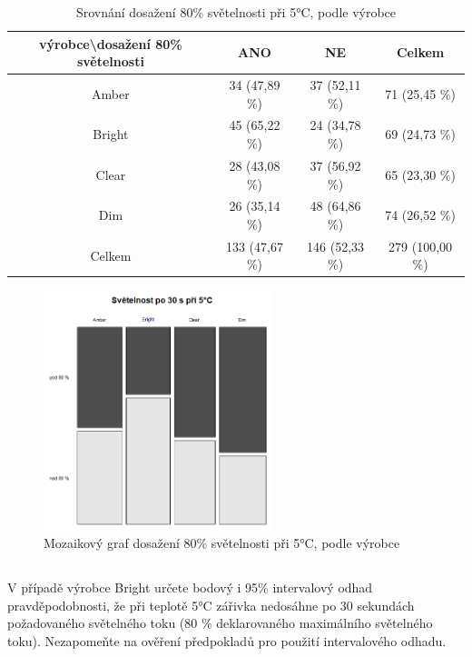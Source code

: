 \documentclass[czech]{article}%
\begin{document}
\begin{table}[H]
	\centering
	\caption{Srovnání dosažení 80\% světelnosti při 5°C, podle výrobce}
	\label{tab:svetelnost_4}
    \begin{tabular}{c|c|c|c}
        výrobce\textbackslash dosažení 80\% světelnosti & ANO               & NE               & Celkem                 \\
        \hline
        Amber                                           & 34   (47,89 \%)   & 37   (52,11 \%)  & 71      (25,45 \%)     \\
        \hline
        Bright                                          & 45   (65,22 \%)   & 24   (34,78 \%)  & 69      (24,73 \%)     \\
        \hline
        Clear                                           & 28   (43,08 \%)   & 37   (56,92 \%)  & 65      (23,30 \%)     \\
        \hline
        Dim                                             & 26   (35,14 \%)   & 48   (64,86 \%)  & 74      (26,52 \%)     \\
        \hline
        Celkem                                          & 133  (47,67 \%)   & 146  (52,33 \%)  & 279     (100,00 \%)    \\
    \end{tabular}
\end{table}

\begin{figure}[H]
	\centering
	\includegraphics[width=0.6\textwidth]{Figures/Mosaic_4.png}
	\caption{Mozaikový graf dosažení 80\% světelnosti při 5°C, podle výrobce}
	\label{fig:Mosaic_4}
\end{figure}


\newpage
\subsection{}
V případě výrobce Bright určete bodový i 95\% intervalový odhad pravděpodobnosti, 
že při teplotě 5°C zářivka nedosáhne po 30 sekundách požadovaného světelného toku 
(80 \% deklarovaného maximálního světelného toku). 
Nezapomeňte na ověření předpokladů pro použití intervalového odhadu.
\end{document}
